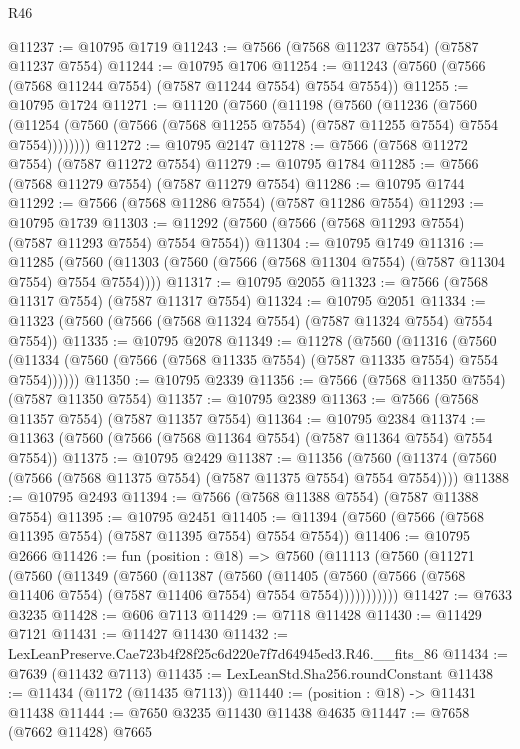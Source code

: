 \begin{lexlean}{R46}
\begin{coremodule}
@11237 := @10795 @1719
@11243 := @7566 (@7568 @11237 @7554) (@7587 @11237 @7554)
@11244 := @10795 @1706
@11254 := @11243 (@7560 (@7566 (@7568 @11244 @7554) (@7587 @11244 @7554) @7554 @7554))
@11255 := @10795 @1724
@11271 := @11120
    (@7560
      (@11198
        (@7560
          (@11236
            (@7560
              (@11254 (@7560 (@7566 (@7568 @11255 @7554) (@7587 @11255 @7554) @7554 @7554))))))))
@11272 := @10795 @2147
@11278 := @7566 (@7568 @11272 @7554) (@7587 @11272 @7554)
@11279 := @10795 @1784
@11285 := @7566 (@7568 @11279 @7554) (@7587 @11279 @7554)
@11286 := @10795 @1744
@11292 := @7566 (@7568 @11286 @7554) (@7587 @11286 @7554)
@11293 := @10795 @1739
@11303 := @11292 (@7560 (@7566 (@7568 @11293 @7554) (@7587 @11293 @7554) @7554 @7554))
@11304 := @10795 @1749
@11316 := @11285
    (@7560 (@11303 (@7560 (@7566 (@7568 @11304 @7554) (@7587 @11304 @7554) @7554 @7554))))
@11317 := @10795 @2055
@11323 := @7566 (@7568 @11317 @7554) (@7587 @11317 @7554)
@11324 := @10795 @2051
@11334 := @11323 (@7560 (@7566 (@7568 @11324 @7554) (@7587 @11324 @7554) @7554 @7554))
@11335 := @10795 @2078
@11349 := @11278
    (@7560
      (@11316
        (@7560 (@11334 (@7560 (@7566 (@7568 @11335 @7554) (@7587 @11335 @7554) @7554 @7554))))))
@11350 := @10795 @2339
@11356 := @7566 (@7568 @11350 @7554) (@7587 @11350 @7554)
@11357 := @10795 @2389
@11363 := @7566 (@7568 @11357 @7554) (@7587 @11357 @7554)
@11364 := @10795 @2384
@11374 := @11363 (@7560 (@7566 (@7568 @11364 @7554) (@7587 @11364 @7554) @7554 @7554))
@11375 := @10795 @2429
@11387 := @11356
    (@7560 (@11374 (@7560 (@7566 (@7568 @11375 @7554) (@7587 @11375 @7554) @7554 @7554))))
@11388 := @10795 @2493
@11394 := @7566 (@7568 @11388 @7554) (@7587 @11388 @7554)
@11395 := @10795 @2451
@11405 := @11394 (@7560 (@7566 (@7568 @11395 @7554) (@7587 @11395 @7554) @7554 @7554))
@11406 := @10795 @2666
@11426 := fun (position : @18) =>
  @7560
    (@11113
      (@7560
        (@11271
          (@7560
            (@11349
              (@7560
                (@11387
                  (@7560
                    (@11405
                      (@7560 (@7566 (@7568 @11406 @7554) (@7587 @11406 @7554) @7554 @7554)))))))))))
@11427 := @7633 @3235
@11428 := @606 @7113
@11429 := @7118 @11428
@11430 := @11429 @7121
@11431 := @11427 @11430
@11432 := LexLeanPreserve.Cae723b4f28f25c6d220e7f7d64945ed3.R46.__fits_86
@11434 := @7639 (@11432 @7113)
@11435 := LexLeanStd.Sha256.roundConstant
@11438 := @11434 (@1172 (@11435 @7113))
@11440 := (position : @18) -> @11431 @11438
@11444 := @7650 @3235 @11430 @11438 @4635
@11447 := @7658 (@7662 @11428) @7665

\end{coremodule}
\end{lexlean}
